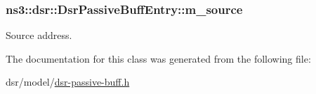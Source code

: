 \subsubsection[{\texorpdfstring{m\+\_\+source}{m_source}}]{ ns3\+::dsr\+::\+Dsr\+Passive\+Buff\+Entry\+::m\+\_\+source\hspace{0.3cm}{\ttfamily [private]}}\hypertarget{classns3_1_1dsr_1_1DsrPassiveBuffEntry_ad712ad7f3db0141e74b08aacefc8ca07}{}\label{classns3_1_1dsr_1_1DsrPassiveBuffEntry_ad712ad7f3db0141e74b08aacefc8ca07}


Source address. 



The documentation for this class was generated from the following file\+:\begin{DoxyCompactItemize}
\item 
dsr/model/\hyperlink{dsr-passive-buff_8h}{dsr-\/passive-\/buff.\+h}\end{DoxyCompactItemize}
